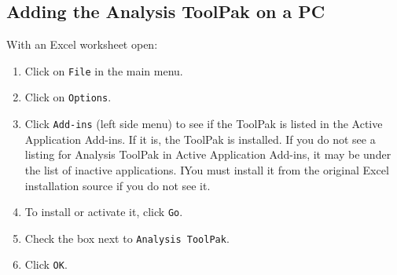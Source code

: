 \documentclass[
]{book}
\providecommand{\tightlist}{%
  \setlength{\itemsep}{0pt}\setlength{\parskip}{0pt}}
\begin{document}
\hypertarget{adding-the-analysis-toolpak-on-a-pc}{%
\subsection{Adding the Analysis ToolPak on a PC}\label{adding-the-analysis-toolpak-on-a-pc}}

With an Excel worksheet open:

\begin{enumerate}
\def\labelenumi{\arabic{enumi}.}
\tightlist
\item
  Click on \texttt{File} in the main menu.
\item
  Click on \texttt{Options}.
\item
  Click \texttt{Add-ins} (left side menu) to see if the ToolPak is listed in the Active Application Add-ins. If it is, the ToolPak is installed. If you do not see a listing for Analysis ToolPak in Active Application Add-ins, it may be under the list of inactive applications. IYou must install it from the original Excel installation source if you do not see it.
\item
  To install or activate it, click \texttt{Go}.
\item
  Check the box next to \texttt{Analysis\ ToolPak}.
\item
  Click \texttt{OK}.
\end{enumerate}
\end{document}
